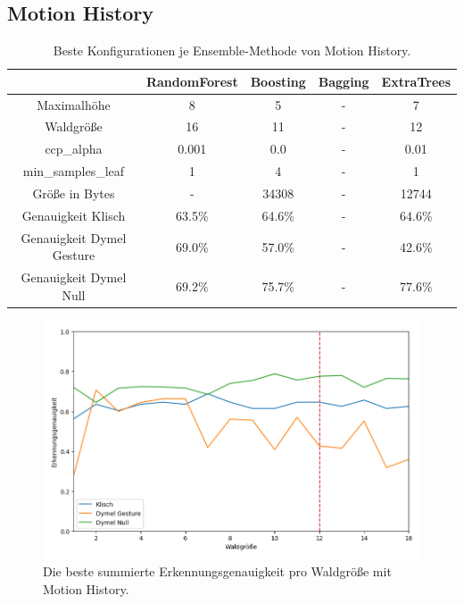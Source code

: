 \subsection{Motion History}
\begin{table}[h!]
    \centering
    \begin{tabular}{ | c | c | c | c | c |}
        \hline
        & RandomForest & Boosting & Bagging & ExtraTrees \\\hline
        Maximalhöhe & 8 & 5 & - & 7 \\\hline
        Waldgröße & 16 & 11 & - & 12 \\\hline
        ccp\_alpha & 0.001 & 0.0 & - & 0.01 \\\hline
        min\_samples\_leaf & 1 & 4 & - & 1 \\\hline
        Größe in Bytes & - & 34308 & - & 12744 \\\hline
        Genauigkeit Klisch & 63.5\% & 64.6\% & - & 64.6\% \\\hline
        Genauigkeit Dymel Gesture & 69.0\% & 57.0\% & - & 42.6\% \\\hline
        Genauigkeit Dymel Null & 69.2\% & 75.7\% & - & 77.6\% \\\hline
    \end{tabular}
    \caption{Beste Konfigurationen je Ensemble-Methode von Motion History.}
    \label{tab:motion_history}
\end{table}
\begin{figure}[h!]
    \centering
    \includegraphics[width=\linewidth]{images/motion_history_acc_per_size.png}
    \caption{Die beste summierte Erkennungsgenauigkeit pro Waldgröße mit Motion History.}
    \label{fig:motion_history_per_forest_size}
\end{figure}
